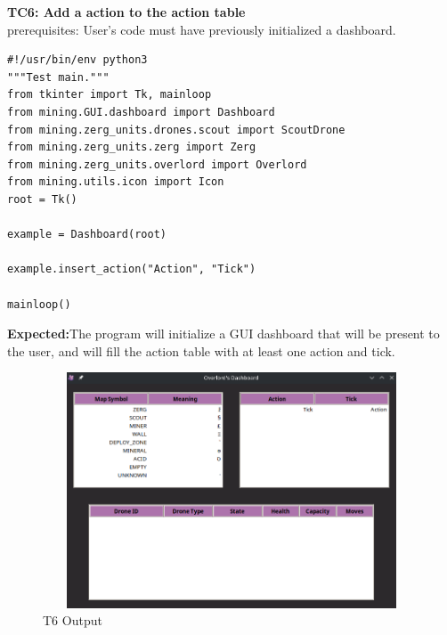 \documentclass{article}
\begin{document}
\newpage
\Large\textbf{TC6: Add a action to the action table}\\
\indent\large{prerequisites: User's code must have previously initialized a dashboard.}\\
\begin{lstlisting}
#!/usr/bin/env python3
"""Test main."""
from tkinter import Tk, mainloop
from mining.GUI.dashboard import Dashboard
from mining.zerg_units.drones.scout import ScoutDrone
from mining.zerg_units.zerg import Zerg
from mining.zerg_units.overlord import Overlord
from mining.utils.icon import Icon
root = Tk()

example = Dashboard(root)

example.insert_action("Action", "Tick")
            
mainloop()  

\end{lstlisting}
\begin{description}
    \textbf{Expected:}{The program will initialize a GUI dashboard that will be present to the user, and will fill the action table with at least one action and tick.}
    \begin{figure}[htp]
    \includegraphics[width=15cm, height=7cm]{testcase6.png}
    
    \caption{T6 Output}
    \label{fig:galaxy}
\end{figure}
\end{description}
\end{document}
